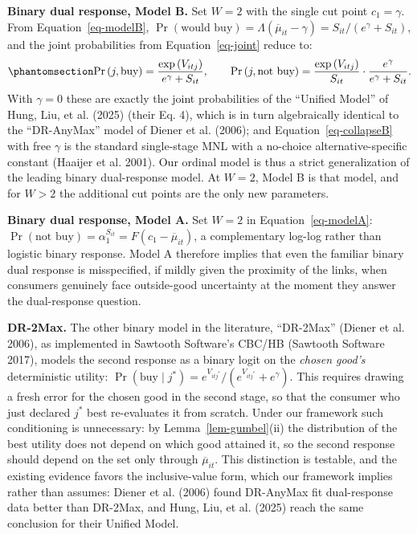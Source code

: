 \documentclass[
  letterpaper,
  DIV=11,
  numbers=noendperiod]{scrartcl}
\theoremstyle{plain}
\theoremstyle{plain}
\theoremstyle{remark}
\begin{document}
\textbf{Binary dual response, Model B.} Set \(W=2\) with the single cut
point \(c_1 = \gamma\). From Equation~\ref{eq-modelB},
\(\Pr(\text{would buy}) = \Lambda\left( \overline{\mu}_{it} - \gamma \right) = S_{it} \big/ \left( e^{\gamma} + S_{it} \right)\),
and the joint probabilities from Equation~\ref{eq-joint} reduce to:
\begin{equation}\protect\phantomsection\label{eq-collapseB}{
\Pr \left( j, \text{buy} \right) = \frac{\exp \left( V_{itj} \right)}{e^{\gamma} + S_{it}},
\qquad
\Pr \left( j, \text{not buy} \right) = \frac{\exp \left( V_{itj} \right)}{S_{it}} \cdot \frac{e^{\gamma}}{e^{\gamma} + S_{it}}.
}\end{equation} With \(\gamma = 0\) these are exactly the joint
probabilities of the ``Unified Model'' of Hung, Liu, et al. (2025)
(their Eq. 4), which is in turn algebraically identical to the
``DR-AnyMax'' model of Diener et al. (2006); and
Equation~\ref{eq-collapseB} with free \(\gamma\) is the standard
single-stage MNL with a no-choice alternative-specific constant (Haaijer
et al. 2001). Our ordinal model is thus a strict generalization of the
leading binary dual-response model. At \(W=2\), Model B is that model,
and for \(W>2\) the additional cut points are the only new parameters.

\textbf{Binary dual response, Model A.} Set \(W=2\) in
Equation~\ref{eq-modelA}:
\(\Pr(\text{not buy}) = \alpha_1^{S_{it}} = F\left( c_1 - \overline{\mu}_{it}\right)\),
a complementary log-log rather than logistic binary response. Model A
therefore implies that even the familiar binary dual response is
misspecified, if mildly given the proximity of the links, when consumers
genuinely face outside-good uncertainty at the moment they answer the
dual-response question.

\textbf{DR-2Max.} The other binary model in the literature, ``DR-2Max''
(Diener et al. 2006), as implemented in Sawtooth Software's CBC/HB
(Sawtooth Software 2017), models the second response as a binary logit
on the \emph{chosen good's} deterministic utility:
\(\Pr(\text{buy} \mid j^*) = e^{V_{itj^*}} \big/ \left( e^{V_{itj^*}} + e^{\gamma} \right)\).
This requires drawing a fresh error for the chosen good in the second
stage, so that the consumer who just declared \(j^*\) best re-evaluates
it from scratch. Under our framework such conditioning is unnecessary:
by Lemma~\ref{lem-gumbel}(ii) the distribution of the best utility does
not depend on which good attained it, so the second response should
depend on the set only through \(\overline{\mu}_{it}\). This distinction
is testable, and the existing evidence favors the inclusive-value form,
which our framework implies rather than assumes: Diener et al. (2006)
found DR-AnyMax fit dual-response data better than DR-2Max, and Hung,
Liu, et al. (2025) reach the same conclusion for their Unified Model.
\end{document}
